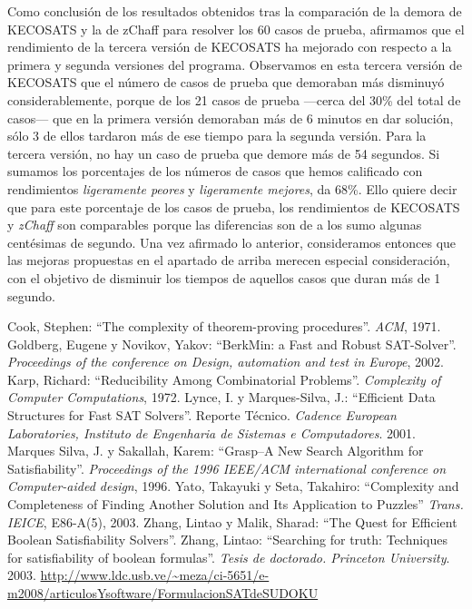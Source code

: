\documentclass[12pt,lettersize,oneside]{article}
\begin{document}
Como conclusión de los resultados obtenidos tras la comparación de la demora de
KECOSATS y la de zChaff para resolver los 60 casos de prueba, afirmamos que el
rendimiento de la tercera versión de KECOSATS ha mejorado con respecto a la
primera y segunda versiones del programa. Observamos en esta tercera versión de
KECOSATS que el número de casos de prueba que demoraban más disminuyó
considerablemente, porque de los 21 casos de prueba ---cerca del 30\% del total
de casos--- que en la primera versión demoraban más de 6 minutos en dar
solución, sólo 3 de ellos tardaron más de ese tiempo para la segunda
versión. Para la tercera versión, no hay un caso de prueba que demore más de 54
segundos. Si sumamos los porcentajes de los números de casos que hemos
calificado con rendimientos \emph{ligeramente peores} y \emph{ligeramente
  mejores}, da 68\%. Ello quiere decir que para este porcentaje de los casos de
prueba, los rendimientos de KECOSATS y \emph{zChaff} son comparables porque las
diferencias son de a los sumo algunas centésimas de segundo.  Una vez afirmado
lo anterior, consideramos entonces que las mejoras propuestas en el apartado de
arriba merecen especial consideración, con el objetivo de disminuir los tiempos
de aquellos casos que duran más de 1 segundo.

\begin{thebibliography}{99}
Cook, Stephen: ``The complexity of theorem-proving
  procedures''. \emph{ACM}, 1971.
 Goldberg, Eugene y Novikov, Yakov: ``BerkMin: a Fast and
  Robust SAT-Solver''. \emph{Proceedings of the conference on Design, automation
    and test in Europe}, 2002.
Karp, Richard: ``Reducibility Among Combinatorial
  Problems''. \emph{Complexity of Computer Computations}, 1972.
Lynce, I. y Marques-Silva, J.: ``Efficient Data Structures for
  Fast SAT Solvers''. Reporte Técnico. \emph{Cadence European Laboratories,
    Instituto de Engenharia de Sistemas e Computadores}. 2001.
Marques Silva, J. y Sakallah, Karem: ``Grasp--A New Search
  Algorithm for Satisfiability''. \emph{Proceedings of the 1996 IEEE/ACM
    international conference on Computer-aided design}, 1996.
Yato, Takayuki y Seta, Takahiro: ``Complexity and Completeness
  of Finding Another Solution and Its Application to Puzzles''  \emph{Trans. IEICE}, E86-A(5), 2003.
Zhang, Lintao y Malik, Sharad: ``The Quest for Efficient Boolean
  Satisfiability Solvers''.
Zhang, Lintao: ``Searching for truth: Techniques for
  satisfiability of boolean formulas''. \emph{Tesis de doctorado. Princeton
    University}. 2003.
\url{http://www.ldc.usb.ve/~meza/ci-5651/e-m2008/articulosYsoftware/FormulacionSATdeSUDOKU}
\end{thebibliography}
\end{document}
